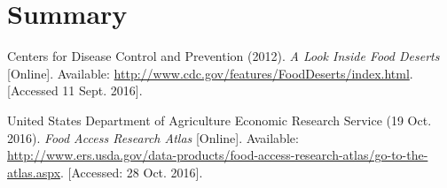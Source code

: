 \documentclass[12pt]{article}
\begin{document}

\section{Summary}


\pagebreak

\pagebreak

\begin{thebibliography}{9}
    Centers for Disease Control and Prevention (2012).
    \textit{A Look Inside Food Deserts} [Online].
    Available: \url{http://www.cdc.gov/features/FoodDeserts/index.html}.
    [Accessed 11 Sept. 2016].

    United States Department of Agriculture Economic Research Service (19 Oct. 2016).
    \textit{Food Access Research Atlas} [Online].
    Available:
    \url{http://www.ers.usda.gov/data-products/food-access-research-atlas/go-to-the-atlas.aspx}.
    [Accessed: 28 Oct. 2016].

\end{thebibliography}
\end{document}
